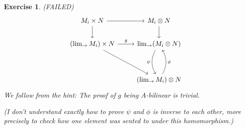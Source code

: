 \documentclass{article}
\theoremstyle{breakstyle}
\newtheorem{exercise}{Exercise}
\begin{document}
\begin{exercise}
    \textbf{}{(FAILED)}
    $$
        \begin{tikzcd}
        M_i\times N \arrow[r] \arrow[d]                                & M_i\otimes N \arrow[d]                                            \\
        (\lim_{\rightarrow} M_i)\times N \arrow[r, "g"] \arrow[rdd] & \lim_{\rightarrow}(M_i \otimes N) \arrow[dd, "\psi"', bend right] \\
                                                                       &                                                                   \\
                                                                       & (\lim_{\rightarrow}M_i)\otimes N \arrow[uu, "\phi"', bend right] 
        \end{tikzcd}
    $$
    We follow from the hint:
    The proof of $g$ being $A$-bilinear is trivial.

    \emph{(I don't understand exactly how to prove $\psi$ and $\phi$ is inverse to each other, more precisely to check how one element was sented to under this homomorphism.)}
\end{exercise}
\end{document}
